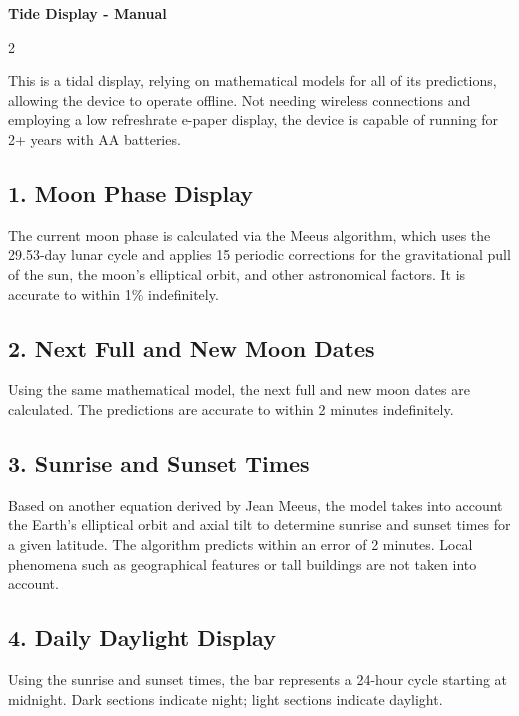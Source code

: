 \documentclass[a5paper,8pt]{article}
\begin{document}
\begin{center}
{\large\bfseries Tide Display - Manual}
\end{center}

\vspace{0.1em}

\begin{multicols}{2}
\footnotesize

\noindent This is a tidal display, relying on mathematical models for all of its predictions, allowing the device to operate offline. Not needing wireless connections and employing a low refreshrate e-paper display, the device is capable of running for 2+ years with AA batteries.

\subsection*{1. Moon Phase Display}
The current moon phase is calculated via the Meeus algorithm, which uses the 29.53-day lunar cycle and applies 15 periodic corrections for the gravitational pull of the sun, the moon's elliptical orbit, and other astronomical factors. It is accurate to within 1\% indefinitely.

\subsection*{2. Next Full and New Moon Dates}
Using the same mathematical model, the next full and new moon dates are calculated. The predictions are accurate to within 2 minutes indefinitely.

\subsection*{3. Sunrise and Sunset Times}
Based on another equation derived by Jean Meeus, the model takes into account the Earth's elliptical orbit and axial tilt to determine sunrise and sunset times for a given latitude. The algorithm predicts within an error of 2 minutes. Local phenomena such as geographical features or tall buildings are not taken into account.

\subsection*{4. Daily Daylight Display}
Using the sunrise and sunset times, the bar represents a 24-hour cycle starting at midnight. Dark sections indicate night; light sections indicate daylight.


\end{multicols}
\end{document}
